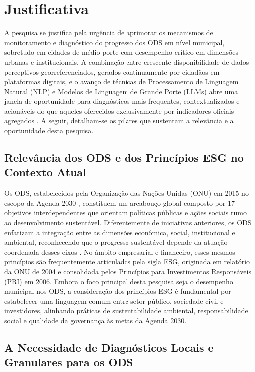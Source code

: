 \chapter{Justificativa}
\label{cap:justificativa}

A pesquisa se justifica pela urgência de aprimorar os mecanismos de
monitoramento e diagnóstico do progresso dos \gls{ODS} em nível municipal, sobretudo em cidades de médio porte
com desempenho crítico em dimensões urbanas e institucionais. A combinação
entre crescente disponibilidade de dados perceptivos georreferenciados,
gerados continuamente por cidadãos em plataformas digitais, e o avanço de
técnicas de Processamento de Linguagem Natural (\gls{NLP}) e Modelos de
Linguagem de Grande Porte (\gls{LLM}s) abre uma janela de oportunidade para
diagnósticos mais frequentes, contextualizados e acionáveis do que aqueles
oferecidos exclusivamente por indicadores oficiais agregados
\cite{abidoye2022,larosa2025,fu2023}. A seguir, detalham-se os pilares que
sustentam a relevância e a oportunidade desta pesquisa.

\section{Relevância dos ODS e dos Princípios ESG no Contexto Atual}
\label{sec:relevancia-esg}

Os \gls{ODS}, estabelecidos pela Organização das Nações Unidas (ONU) em 2015
no escopo da Agenda 2030 \cite{onu2015}, constituem um arcabouço global
composto por 17 objetivos interdependentes que orientam políticas públicas e
ações sociais rumo ao desenvolvimento sustentável. Diferentemente de
iniciativas anteriores, os ODS enfatizam a integração entre as dimensões
econômica, social, institucional e ambiental, reconhecendo que o progresso
sustentável depende da atuação coordenada desses eixos \cite{massey2022}. No
âmbito empresarial e financeiro, esses mesmos princípios são frequentemente
articulados pela sigla \gls{ESG}, originada em relatório da ONU de 2004 e
consolidada pelos Princípios para Investimentos Responsáveis ({PRI}) em
2006. Embora o foco principal desta pesquisa seja o
desempenho municipal nos ODS, a consideração dos princípios ESG é
fundamental por estabelecer uma linguagem comum entre setor público,
sociedade civil e investidores, alinhando práticas de sustentabilidade
ambiental, responsabilidade social e qualidade da governança às metas da
Agenda 2030.

\section{A Necessidade de Diagnósticos Locais e Granulares para os ODS}
\label{sec:necessidade-diagnosticos}


